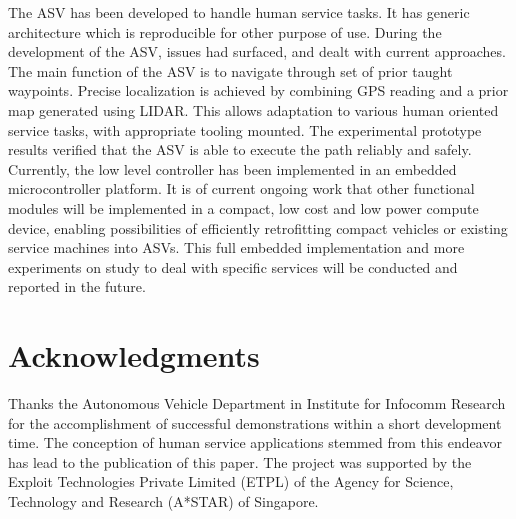 \documentclass[10 pt,a4paper,conference]{IEEEtran}
\begin{document}
The ASV has been developed to handle human service tasks. It has generic
architecture which is reproducible for other purpose of use. During the
development of the ASV, issues had surfaced, and dealt with current
approaches. The main function of the ASV is to navigate through set of
prior taught waypoints. Precise localization is achieved by combining
GPS reading and a prior map generated using LIDAR. This allows
adaptation to various human oriented service tasks, with appropriate
tooling mounted. The experimental prototype results verified that the
ASV is able to execute the path reliably and safely. Currently, the low
level controller has been implemented in an embedded microcontroller
platform. It is of current ongoing work that other functional modules
will be implemented in a compact, low cost and low power compute device,
enabling possibilities of efficiently retrofitting compact vehicles or
existing service machines into ASVs. This full embedded implementation
and more experiments on study to deal with specific services will be
conducted and reported in the future.

\section*{Acknowledgments}\label{acknowledgments}

Thanks the Autonomous Vehicle Department in Institute for Infocomm
Research for the accomplishment of successful demonstrations within a
short development time. The conception of human service applications
stemmed from this endeavor has lead to the publication of this paper.
The project was supported by the Exploit Technologies Private Limited
(ETPL) of the Agency for Science, Technology and Research (A*STAR) of
Singapore.

\small

                                    \renewcommand\refname{References}
                        

    
\end{document}
